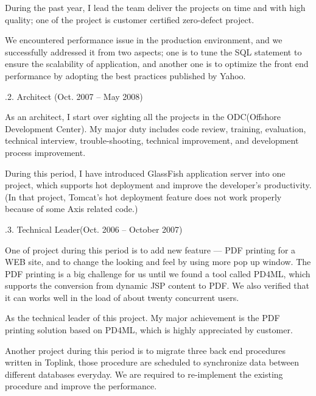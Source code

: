 During the past year, I lead the team deliver the projects on time and with high quality;
one of the project is customer certified zero-defect project.

We encountered performance issue in the production environment, and we successfully
addressed it from two aspects; one is to tune the SQL statement to ensure the scalability
of application, and another one is to optimize the front end performance by adopting
the best practices published by Yahoo.
  

\smallskip\noindent
{}.2. Architect (Oct. 2007 -- May 2008)\par
\noindent
As an architect, I start over sighting all the projects in the ODC(Offshore Development Center).
My major duty includes code review, training, evaluation, technical interview, trouble-shooting,
 technical improvement, and development process improvement. 

During this period, I have introduced GlassFish application server into one project, which 
supports hot deployment and improve the developer's productivity. (In that project, Tomcat's
hot deployment feature does not work properly because of some Axis related code.)


.3. Technical Leader(Oct. 2006 -- October 2007)\par
\noindent
One of project during this period is to add new feature --- PDF printing for a WEB site, and to
change the looking and feel by using more pop up window. The PDF printing 
is a big challenge for us until we found a tool called PD4ML, which supports
the conversion from dynamic JSP content to PDF. We also verified that it can 
works well in the load of about twenty concurrent users. 

As the technical leader of this project. My major achievement is
the PDF printing solution based on PD4ML, which is highly appreciated by customer.

\smallskip

Another project during this period is to migrate three back end procedures
written in Toplink, those procedure are scheduled to synchronize data between 
different databases everyday. We are required to re-implement
the existing procedure and improve the performance. 

